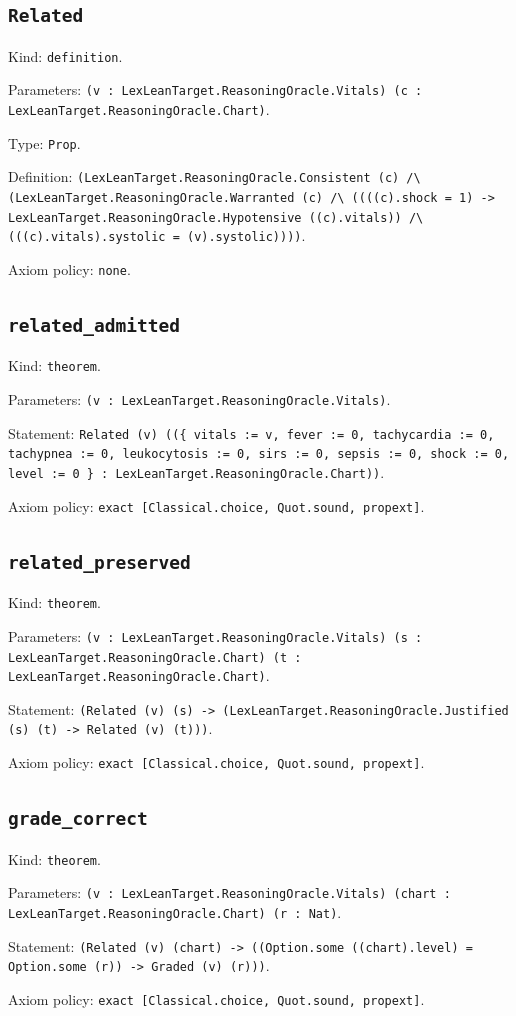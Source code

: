 \documentclass[11pt]{article}
\begin{document}
\subsection*{\texttt{Related}}
\noindent Kind: \texttt{definition}.\par
\noindent Parameters: \texttt{(v : LexLeanTarget.ReasoningOracle.Vitals) (c : LexLeanTarget.ReasoningOracle.Chart)}.\par
\noindent Type: \texttt{Prop}.\par
\noindent Definition: \texttt{(LexLeanTarget.ReasoningOracle.Consistent (c) /\textbackslash{} (LexLeanTarget.ReasoningOracle.Warranted (c) /\textbackslash{} ((((c).shock = 1) -> LexLeanTarget.ReasoningOracle.Hypotensive ((c).vitals)) /\textbackslash{} (((c).vitals).systolic = (v).systolic))))}.\par
\noindent Axiom policy: \texttt{none}.\par
\subsection*{\texttt{related\_admitted}}
\noindent Kind: \texttt{theorem}.\par
\noindent Parameters: \texttt{(v : LexLeanTarget.ReasoningOracle.Vitals)}.\par
\noindent Statement: \texttt{Related (v) ((\{ vitals := v, fever := 0, tachycardia := 0, tachypnea := 0, leukocytosis := 0, sirs := 0, sepsis := 0, shock := 0, level := 0 \} : LexLeanTarget.ReasoningOracle.Chart))}.\par
\noindent Axiom policy: \texttt{exact [Classical.choice, Quot.sound, propext]}.\par
\subsection*{\texttt{related\_preserved}}
\noindent Kind: \texttt{theorem}.\par
\noindent Parameters: \texttt{(v : LexLeanTarget.ReasoningOracle.Vitals) (s : LexLeanTarget.ReasoningOracle.Chart) (t : LexLeanTarget.ReasoningOracle.Chart)}.\par
\noindent Statement: \texttt{(Related (v) (s) -> (LexLeanTarget.ReasoningOracle.Justified (s) (t) -> Related (v) (t)))}.\par
\noindent Axiom policy: \texttt{exact [Classical.choice, Quot.sound, propext]}.\par
\subsection*{\texttt{grade\_correct}}
\noindent Kind: \texttt{theorem}.\par
\noindent Parameters: \texttt{(v : LexLeanTarget.ReasoningOracle.Vitals) (chart : LexLeanTarget.ReasoningOracle.Chart) (r : Nat)}.\par
\noindent Statement: \texttt{(Related (v) (chart) -> ((Option.some ((chart).level) = Option.some (r)) -> Graded (v) (r)))}.\par
\noindent Axiom policy: \texttt{exact [Classical.choice, Quot.sound, propext]}.\par
\end{document}
